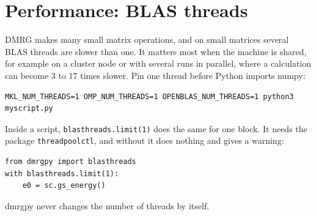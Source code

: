 \documentclass[11pt]{article}
\begin{document}
\section{Performance: BLAS threads}

DMRG makes many small matrix operations, and on small matrices several
BLAS threads are slower than one. It matters most when the machine is
shared, for example on a cluster node or with several runs in parallel,
where a calculation can become 3 to 17 times slower. Pin one thread
before Python imports numpy:

\begin{lstlisting}
MKL_NUM_THREADS=1 OMP_NUM_THREADS=1 OPENBLAS_NUM_THREADS=1 python3 myscript.py
\end{lstlisting}

Inside a script, \texttt{blasthreads.\allowbreak{}limit(1)} does the same for one block. It
needs the package \texttt{threadpoolctl}, and without it does nothing and gives a
warning:

\begin{lstlisting}
from dmrgpy import blasthreads
with blasthreads.limit(1):
    e0 = sc.gs_energy()
\end{lstlisting}

dmrgpy never changes the number of threads by itself.
\end{document}
